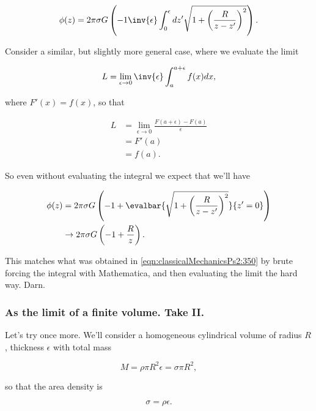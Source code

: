 \begin{equation}\label{eqn:classicalMechanicsPs2:370}
\phi(z) = 2 \pi \sigma G 
\left( -1
\inv{\epsilon} \int_0^\epsilon dz' 
\sqrt{1 + \left(\frac{R}{z-z'}\right)^2} \right).
\end{equation}

Consider a similar, but slightly more general case, where we evaluate the limit

\begin{equation}\label{eqn:classicalMechanicsPs2:390}
L = \lim_{\epsilon \rightarrow 0} \inv{\epsilon} \int_a^{a + \epsilon} f(x) dx,
\end{equation}

where $F'(x) = f(x)$, so that

\begin{align*}
L &= 
\lim_{\epsilon \rightarrow 0} \frac{ F(a + \epsilon) - F(a)}{\epsilon} \\
&= F'(a) \\
&= f(a).
\end{align*}

So even without evaluating the integral we expect that we'll have

\begin{align*}
\phi(z) &= 
2 \pi \sigma G 
\left( -1 + \evalbar{
\sqrt{1 + \left(\frac{R}{z-z'}\right)^2} }{z' = 0} \right) \\
&\rightarrow 
2 \pi \sigma G 
\left( -1 + \frac{R}{z} \right).
\end{align*}

This matches what was obtained in \ref{eqn:classicalMechanicsPs2:350} by brute forcing the integral with Mathematica, and then evaluating the limit the hard way.  Darn.

\subsubsection{As the limit of a finite volume.  Take II.}

Let's try once more.  We'll consider a homogeneous cylindrical volume of radius $R$, thickness $\epsilon$ with total mass

\begin{equation}\label{eqn:classicalMechanicsPs2:n}
M = \rho \pi R^2 \epsilon = \sigma \pi R^2,
\end{equation}

so that the area density is 

\begin{equation}\label{eqn:classicalMechanicsPs2:n}
\sigma = \rho \epsilon.
\end{equation}

